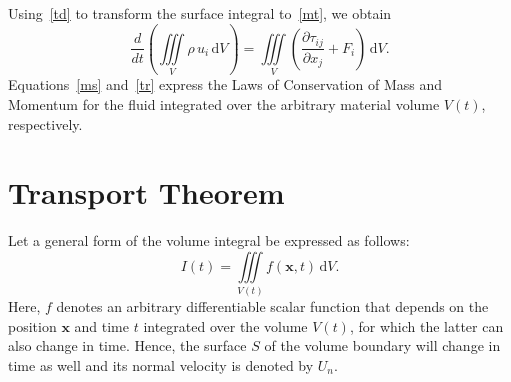\documentclass[12pt,a4paper]{report}
\begin{document}
Using~\eqref{td} to transform the surface integral to~\eqref{mt}, we obtain
\begin{equation}
\frac{d}{dt}\left(\iiint\limits_{V} \rho \, u_i \, \mathrm{d}V \right) = \iiint\limits_{V} \left(\frac{\partial \tau_{ij}}{\partial x_{j}} + F_{i} \right) \, \mathrm{d}V. \label{tr}
\end{equation}
Equations~\eqref{ms} and~\eqref{tr} express the Laws of Conservation of Mass and Momentum for the fluid integrated over the arbitrary material volume $V(t)$, respectively.

\section{Transport Theorem}

Let a general form of the volume integral be expressed as follows:
\begin{equation}
I(t) = \iiint\limits_{V(t)} f(\mathbf{x}, t) \, \mathrm{d}V.
\end{equation}
Here, $f$ denotes an arbitrary differentiable scalar function that depends on the position $\mathbf{x}$ and time $t$ integrated over the volume $V(t)$, for which the latter can also change in time. Hence, the surface $S$ of the volume boundary will change in time as well and its normal velocity is denoted by $U_n$.
\end{document}
